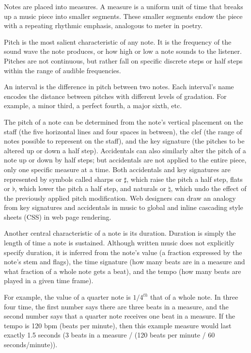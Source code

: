 \documentclass[10pt,preprint]{sigplanconf}
\begin{document}
Notes are placed into measures. A measure is a uniform unit of time that breaks up a music piece into smaller segments. These smaller segments endow the piece with a repeating rhythmic emphasis, analogous to meter in poetry.

Pitch is the most salient characteristic of any note. It is the frequency of the sound wave the note produces, or how high or low a note sounds to the listener. Pitches are not continuous, but rather fall on specific discrete steps or half steps within the range of audible frequencies. 

An interval is the difference in pitch between two notes. Each interval's name encodes the distance between pitches with different levels of gradation. For example, a minor third, a perfect fourth, a major sixth, etc.


The pitch of a note can be determined from the note's vertical placement on the staff (the five horizontal lines and four spaces in between), the clef (the range of notes possible to represent on the staff), and the key signature (the pitches to be altered up or down a half step). Accidentals can also similarly alter the pitch of a note up or down by half steps; but accidentals are not applied to the entire piece, only one specific measure at a time. Both accidentals and key signatures are represented by symbols called sharps or $\sharp$, which raise the pitch a half step, flats or $\flat$, which lower the pitch a half step, and naturals or $\natural$, which undo the effect of the previously applied pitch modification. Web designers can draw an analogy from key signatures and accidentals in music to global and inline cascading style sheets (CSS) in web page rendering.

Another central characteristic of a note is its duration. Duration is simply the length of time a note is sustained. Although written music does not explicitly specify duration, it is inferred from the note's value (a fraction expressed by the note's stem and flags), the time signature (how many beats are in a measure and what fraction of a whole note gets a beat), and the tempo (how many beats are played in a given time frame).

For example, the value of a quarter note is $1/4^{th}$ that of a whole note. In three four time, the first number says there are three beats in a measure, and the second number says that a quarter note receives one beat in a measure. If the tempo is 120 bpm (beats per minute), then this example measure would last exactly 1.5 seconds (3 beats in a measure / (120 beats per minute / 60 seconds/minute)).
\end{document}
